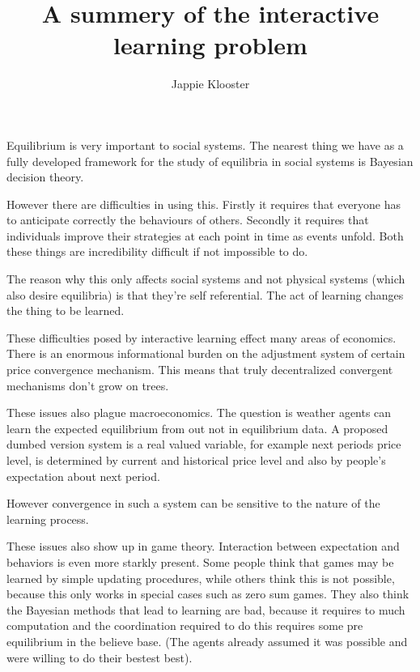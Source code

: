 \documentclass{article}
\begin{document}
\author{Jappie Klooster}
\title{A summery of the interactive learning problem}

\maketitle

Equilibrium is very important to social systems. The nearest
thing we have as a fully developed framework for the study of
equilibria in social systems is Bayesian decision theory.

However there are difficulties in using this. Firstly it requires that
everyone has to anticipate correctly the behaviours of others.
Secondly it requires that individuals improve their strategies
at each point in time as events unfold.
Both these things are incredibility difficult if not impossible to do.

The reason why this only affects social systems and not physical systems
(which also desire equilibria) is that they're self referential.
The act of learning changes the thing to be learned.

These difficulties posed by interactive learning effect many areas of economics.
There is an enormous informational burden on the adjustment
system of certain price convergence mechanism. This means
that truly decentralized convergent mechanisms don't grow
on trees.

These issues also plague macroeconomics. The question
is weather agents can learn the expected equilibrium from
out not in equilibrium data.
A proposed dumbed version system is a real valued variable,
for example next periods price level, is determined by current
and historical price level and also by people's expectation
about next period.

However convergence in such a system can be sensitive to the
nature of the learning process.

These issues also show up in game theory. Interaction
between expectation and behaviors is even more starkly present.
Some people think that games may be learned by simple updating
procedures, while others think this is not possible, because
this only works in special cases such as zero sum games.
They also think the Bayesian methods that lead to learning
are bad, because it requires to much computation and the
coordination required to do this requires some pre equilibrium
in the believe base. (The agents already assumed it was
possible and were willing to do their bestest best).
\end{document}
